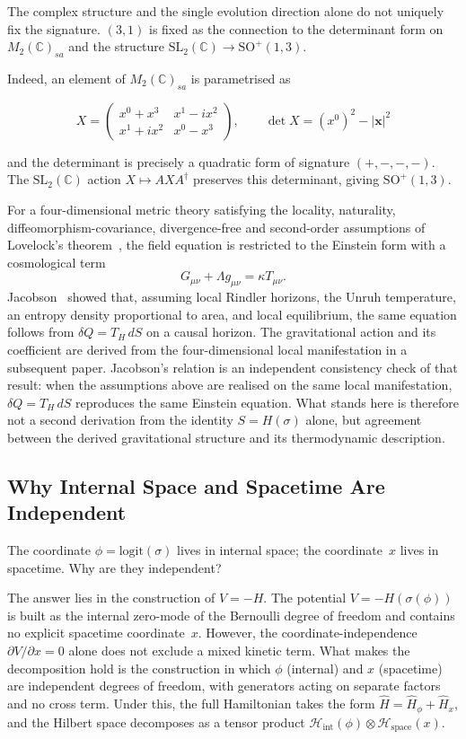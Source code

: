 \documentclass[12pt,a4paper]{article}
\begin{document}
The complex structure and the single evolution direction alone do not uniquely fix the signature. $(3,1)$ is fixed as the connection to the determinant form on $M_2(\mathbb{C})_{sa}$ and the structure $\mathrm{SL}_2(\mathbb{C}) \to \mathrm{SO}^+(1,3)$.

Indeed, an element of $M_2(\mathbb{C})_{sa}$ is parametrised as

\[X = \begin{pmatrix} x^0 + x^3 & x^1 - i x^2 \\ x^1 + i x^2 & x^0 - x^3 \end{pmatrix},\qquad \det X = (x^0)^2 - |\boldsymbol{x}|^2\]

and the determinant is precisely a quadratic form of signature $(+,-,-,-)$. The $\mathrm{SL}_2(\mathbb{C})$ action $X \mapsto AXA^\dagger$ preserves this determinant, giving $\mathrm{SO}^+(1,3)$.

For a four-dimensional metric theory satisfying the locality,
naturality, diffeomorphism-covariance, divergence-free and
second-order assumptions of Lovelock's theorem~\cite{lovelock}, the
field equation is restricted to the Einstein form with a
cosmological term
\[G_{\mu\nu} + \Lambda g_{\mu\nu} = \kappa T_{\mu\nu}.\]
Jacobson~\cite{jacobson} showed that, assuming local Rindler
horizons, the Unruh temperature, an entropy density proportional to
area, and local equilibrium, the same equation follows from
$\delta Q = T_H\,dS$ on a causal horizon.
The gravitational action and its coefficient are derived from the
four-dimensional local manifestation in a subsequent paper.
Jacobson’s relation is an independent consistency check of that
result: when the assumptions above are realised on the same local
manifestation, $\delta Q = T_H\,dS$ reproduces the same Einstein
equation. What stands here is therefore not a second derivation from
the identity $S = H(\sigma)$ alone, but agreement between the derived
gravitational structure and its thermodynamic description.

\subsection{Why Internal Space and Spacetime Are Independent}\label{sec:tensor}

The coordinate $\phi = \mathrm{logit}(\sigma)$ lives in internal space;
the coordinate~$x$ lives in spacetime.  Why are they independent?

The answer lies in the construction of $V = -H$. The potential $V = -H(\sigma(\phi))$ is built as the internal zero-mode of the Bernoulli degree of freedom and contains no explicit spacetime coordinate~$x$. However, the coordinate-independence $\partial V/\partial x = 0$ alone does not exclude a mixed kinetic term. What makes the decomposition hold is the construction in which $\phi$ (internal) and $x$ (spacetime) are independent degrees of freedom, with generators acting on separate factors and no cross term. Under this, the full Hamiltonian takes the form $\hat{H} = \hat{H}_\phi + \hat{H}_x$, and the Hilbert space decomposes as a tensor product $\mathcal{H}_\mathrm{int}(\phi) \otimes \mathcal{H}_\mathrm{space}(x)$.
\end{document}
